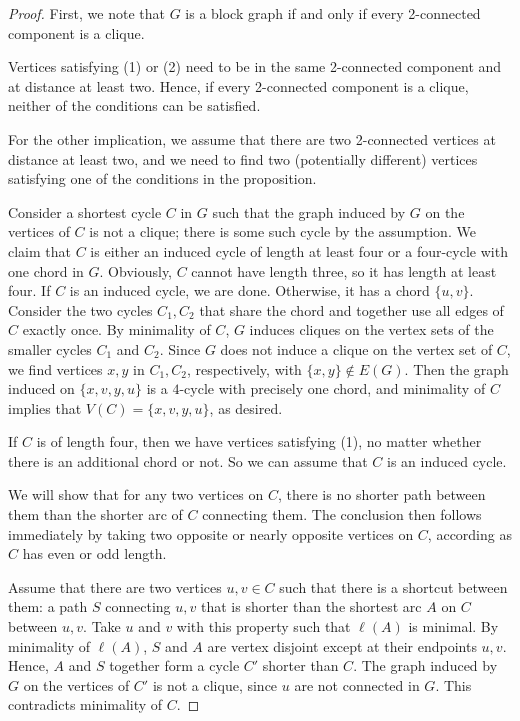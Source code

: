 \documentclass[a4paper, 11pt]{amsart}
\numberwithin{theorem}{section}
\begin{document}
\begin{proof}
    First, we note that $G$ is a block graph if and only if every 2-connected component is a clique.

    Vertices satisfying (1) or (2) need to be in the same 2-connected component and at distance at least two. Hence, if every 2-connected component is a clique, neither of the conditions can be satisfied.

    For the other implication, we assume that there are two
    2-connected vertices at distance at least two, and we need to find
    two (potentially different) vertices satisfying one of the
    conditions in the proposition.

    Consider a shortest cycle $C$ in $G$ such that the graph induced by
    $G$ on the vertices of $C$ is not a clique; there is some such cycle
    by the assumption. We claim that $C$ is either an induced cycle of
    length at least four or a four-cycle with one chord in $G$. Obviously,
    $C$ cannot have length three, so it has length at least four. If
    $C$ is an induced cycle, we are done. Otherwise, it has a chord
    $\{u,v\}$. Consider the two cycles $C_1,C_2$ that share the
    chord and together use all edges of $C$ exactly once. By minimality of $C$, $G$
    induces cliques on the vertex sets of the smaller cycles $C_1$ and $C_2$.  Since $G$
    does not induce a clique on the vertex set of $C$, we find vertices
    $x,y$ in $C_1,C_2$, respectively, with $\{x,y\} \not \in E(G)$. Then
    the graph induced on $\{x,v,y,u\}$ is a $4$-cycle with precisely
    one chord, and minimality of $C$ implies that $V(C)=\{x,v,y,u\}$,
    as desired.

    If $C$ is of length four, then we have vertices satisfying (1), no matter whether there is an additional chord or not. So we can assume that $C$ is an induced cycle.

    We will show that for any two vertices on $C$, there is no shorter
    path between them than the shorter arc of $C$ connecting them. The
    conclusion then follows immediately by taking two opposite or
    nearly opposite vertices on $C$, according as $C$ has even or odd
    length.

    Assume that there are two vertices $u,v\in C$ such that there is a
    shortcut between them: a path $S$ connecting $u,v$ that is shorter
    than the shortest arc $A$ on $C$ between $u,v$. Take $u$ and $v$
    with this property such that $\ell(A)$ is minimal. By minimality
    of $\ell(A)$, $S$ and $A$ are vertex disjoint except at their
    endpoints $u,v$. Hence, $A$ and $S$ together form a cycle $C'$
    shorter than $C$. The graph induced by $G$ on the vertices of $C'$
    is not a clique, since $u$ are not connected in $G$. This
    contradicts minimality of $C$.
\end{proof}
\end{document}
